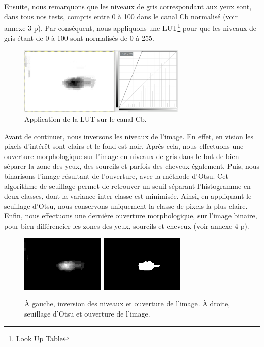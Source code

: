 Ensuite, nous remarquons que les niveaux de gris correspondant aux yeux sont, dans tous nos tests, 
compris entre 0 à 100 dans le canal Cb normalisé (voir annexe 3 p\pageref{grayDiff}). Par conséquent, nous appliquons 
une LUT\footnote{Look Up Table} pour que les niveaux de gris étant de 0 à 100 sont normalisés de 
0 à 255.

\begin{figure}[H]
  \centering
  \includegraphics[width=8cm]{image/008/ycbcr_LUT.png}
  \caption{Application de la LUT sur le canal Cb.}
\end{figure}

Avant de continuer, nous inversons les niveaux de l'image. En effet, en vision les pixels d'intérêt sont clairs et le fond est noir.
Après cela, nous effectuons une ouverture morphologique sur l'image en niveaux de gris dans le but de 
bien séparer la zone des yeux, des sourcils et parfois des cheveux également. Puis, nous binarisons
l'image résultant de l'ouverture, avec la méthode d'Otsu\cite{OTSU_paper}. Cet algorithme de seuillage 
permet de retrouver un seuil séparant l'histogramme en deux classes, dont la variance inter-classe est 
minimisée. Ainsi, en appliquant le seuillage d'Otsu, nous conservons uniquement la classe de pixels la plus 
claire. Enfin, nous effectuons une dernière ouverture morphologique, sur l'image binaire, pour bien 
différencier les zones des yeux, sourcils et cheveux (voir annexe 4 p\pageref{binOtsu}).

\begin{figure}[H]
  \centering
  \includegraphics[width=4cm]{image/008/ycbcr_inv_open.png}
  \includegraphics[width=4cm]{image/008/ycbcr_bin_open.png}
  \caption{À gauche, inversion des niveaux et ouverture de l'image. À droite, seuillage d'Otsu et ouverture de l'image.}
\end{figure}

